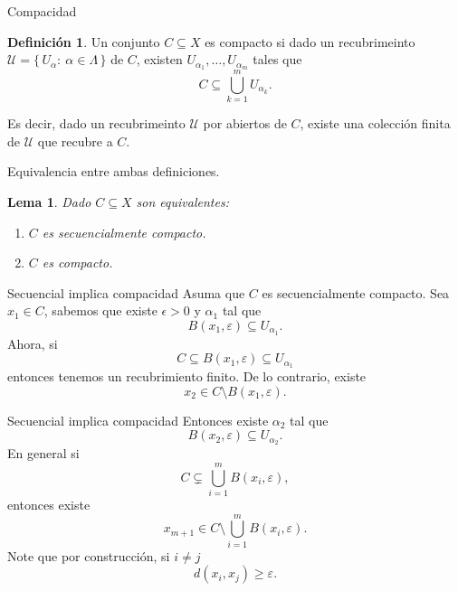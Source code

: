 \documentclass[utf8]{beamer}
\theoremstyle{plain}
\newtheorem{Lem}{Lema}                 %
\theoremstyle{definition}
\newtheorem{Def}{Definición}           %
\theoremstyle{remark}
\numberwithin{equation}{section}
\newcommand{\al}{\alpha}                %
\newcommand{\eps}{\varepsilon}          %
\newcommand{\La}{\Lambda}               %
\newcommand{\cU}{\mathcal{U}}           %
\newcommand{\set}[1]{\{\,#1\,\}}    %
\renewcommand{\geq}{\geqslant}          %
\begin{document}
\begin{frame}{Compacidad}
  
  \begin{Def}\label{def:compacidad}
  Un conjunto $C \subseteq X$ es compacto si dado un recubrimeinto $\cU=\set{U_\al:\ \al\in\La}$ de $C$, existen 
  $U_{\alpha_1}, \ldots, U_{\alpha_m}$ tales que   
  $$C\subseteq \bigcup_{k=1}^{m} U_{\al_k}.$$
  \end{Def}
  
Es decir, dado un recubrimeinto  $\cU$ por abiertos de $C$, existe una colecci\'on finita de  $\cU$ que  recubre a $C$.   
  
\end{frame}

\begin{frame}{Equivalencia entre ambas definiciones.}
 
  \begin{Lem}\label{lem:equivalencia}
    Dado  $C \subseteq X$ son equivalentes:
    \begin{enumerate}       
    \item $C$ es secuencialmente compacto.
    \item $C$ es compacto.
    \end{enumerate}
  \end{Lem}
\end{frame}

\begin{frame}{Secuencial implica compacidad}
Asuma que $C$ es secuencialmente compacto. Sea $x_1 \in C$,  sabemos que existe $\epsilon > 0$  y $\al_1$ tal que 
\[ B(x_1,\eps) \subseteq U_{\al_1}. \]
Ahora, si 
$$ C   \subseteq B(x_1,\eps) \subseteq U_{\al_1}$$
entonces tenemos un recubrimiento finito. De lo contrario, existe 
\[ x_2 \in C \setminus  B(x_1,\eps).\]
 
\end{frame}

\begin{frame}{Secuencial implica compacidad}
Entonces existe  $\al_2$ tal que 
\[ B(x_2,\eps) \subseteq U_{\al_2}. \]
En general si 
$$ C   \subsetneq \bigcup_{i=1}^{m} B(x_i,\eps),$$
entonces existe 
\[ x_{m+1} \in C \setminus   \bigcup_{i=1}^{m} B(x_i,\eps).\]
Note que por construcci\'on, si $ i \not= j$ 
$$ d( x_i, x_j) \geq \eps.$$
 
\end{frame}
\end{document}
